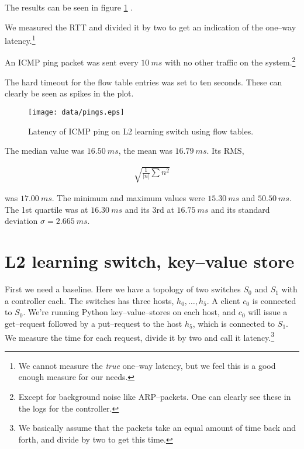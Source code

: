 The results can be seen in figure
\ref{benchmark:l2.learning.switch.ping}
.

We measured the \ac{RTT} and divided it by two to get an indication of the
one--way latency.\footnote{We cannot measure the \textit{true} one--way
latency, but we feel this is a good enough measure for our needs.}

An ICMP ping packet was sent every $10~ms$ with no other traffic on the
system.\footnote{Except for background noise like ARP--packets.  One can
clearly see these in the logs for the controller.}

The hard timeout for the flow table entries was set to ten seconds.  These
can clearly be seen as spikes in the plot.

\begin{figure}
  \centering
  \texttt{[image: data/pings.eps]}
  \caption{Latency of ICMP ping on L2 learning switch using flow tables.}
  \label{benchmark:l2.learning.switch.ping}
\end{figure}

The median value was $16.50~ms$, the mean was $16.79~ms$.
Its \ac{RMS},

\begin{gather}
  \sqrt{\frac{1}{|n]}\sum{n^2}}
  \label{equation:rms}
\end{gather}

was $17.00~ms$.
The minimum and maximum values were $15.30~ms$ and $50.50~ms$.
The 1st quartile was at $16.30~ms$ and its 3rd at $16.75~ms$ and its standard
deviation $\sigma = 2.665~ms$.


\section{L2 learning switch, key--value store}
\label{chapter:benchmark.l2.kv.noflows}

First we need a baseline.  Here we have a topology of two switches $S_0$ and
$S_1$ with a controller each.  The switches has three hosts, $h_0, \dots, h_5$.
A client $c_0$ is connected to $S_0$. We're running Python
key--value--stores on each host, and $c_0$ will issue a get--request
followed by a put--request to the host $h_5$, which is connected to $S_1$.
We measure the time for each request, divide it
by two and call it latency.\footnote{We basically assume that the packets
take an equal amount of time back and forth, and divide by two to get this
time.}

